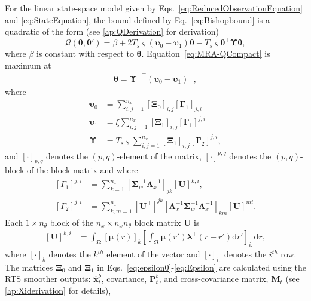 \documentclass[review,authoryear,3p]{elsarticle}
\begin{document}
For the linear state-space model given by Eqs.~\eqref{eq:ReducedObservationEquation} and \eqref{eq:StateEquation}, the bound defined by Eq.~\eqref{eq:Bishopbound} is a quadratic of the form (see \ref{ap:QDerivation} for derivation) 
\begin{equation}\label{eq:MRA-QCompact}
\mathcal Q\left(\boldsymbol \theta,\boldsymbol\theta'\right)=\beta+2T_s\varsigma\left(\boldsymbol\upsilon_0-\boldsymbol\upsilon_1\right)\boldsymbol\theta-T_s\varsigma\boldsymbol\theta^\top\boldsymbol\Upsilon\boldsymbol\theta,
\end{equation}
where $\beta$ is constant with respect to $\boldsymbol\theta$. Equation~\eqref{eq:MRA-QCompact} is maximum at
\begin{align}\label{eq:MRA-thetahat}
\boldsymbol \theta= \boldsymbol\Upsilon^{-\top}(\boldsymbol\upsilon_0-\boldsymbol\upsilon_1)^\top,
\end{align}
where
\begin{align}
\boldsymbol\upsilon_0&=\sum_{i,j=1}^{n_x}[\boldsymbol\Xi_0]_{i,j}[\boldsymbol\Gamma_1]_{j,i}\label{eq:epsilon0} \\
\boldsymbol\upsilon_1&=\xi\sum_{i,j=1}^{n_x}[\boldsymbol\Xi_1]_{i,j}[\boldsymbol\Gamma_1]^{j,i} \label{eq:epsilon1}\\
\boldsymbol\Upsilon&=T_s\varsigma\sum_{i,j=1}^{n_x}[\boldsymbol\Xi_1]_{i,j}[\boldsymbol\Gamma_2]^{j,i},\label{eq:Epsilon}
\end{align} 
and $[\cdot]_{p,q}$ denotes the $\left(p,q\right)$-element of the matrix, $ [\cdot]^{p,q}$ denotes the $\left(p,q\right)$-block of the block matrix and where 
\begin{align}
\left[ \Gamma_1\right]^{j,i} &=\sum_{k=1}^{n_x}\left[ \boldsymbol\Sigma_w^{-1}\boldsymbol\Lambda_x^{-1}\right]_{jk} \left[ \mathbf U\right]^{k,i},\\
\left[ \Gamma_2\right] ^{j,i}&=\sum_{k,m=1}^{n_x}[\mathbf U^{\top}]^{jk} \left[\boldsymbol\Lambda_x^{-1}\boldsymbol\Sigma_w^{-1}\boldsymbol\Lambda_x^{-1} \right]_{km}[\mathbf U]^{mi}.
\end{align}
Each $ 1 \times n_{\theta}$ block of the $n_x \times n_x n_{\theta}$ block matrix $\mathbf U$ is 
\begin{align}\label{eq:Uij}
\left[ \mathbf U\right] ^{k,i}&=\int_{\boldsymbol \Omega}\left[\boldsymbol\mu(r) \right]_k \left[\int_{\boldsymbol\Omega} \boldsymbol\mu\left(r'\right)\boldsymbol \lambda^\top \left(r-r'\right) \mathrm{d}r'\right]_{i:} \mathrm{d}r,
\end{align}
where $\left[\cdot\right]_k$ denotes the $k^{th}$ element of the vector and $[\cdot]_{i:} $ denotes the $i^{th}$ row. The matrices $\boldsymbol\Xi_0$ and $\boldsymbol\Xi_1$ in Eqs.~\eqref{eq:epsilon0}-\eqref{eq:Epsilon} are calculated using the RTS smoother outputs: $\hat{\mathbf x}_t^b$, covariance, $\mathbf P_t^b$, and cross-covariance matrix, $\mathbf M_t$ \citep{Gibsona2005} (see \ref{ap:Xiderivation} for details), 
\end{document}

